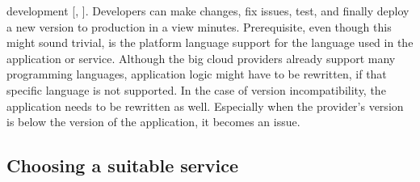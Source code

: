 \documentclass[11pt]{article}
\begin{document}
development [\cite{sewak2018winning}, \cite{leitner2019mixed}]. Developers can make changes, fix issues, test, and finally deploy a new version to production in a view minutes. Prerequisite, even though this might sound trivial, is the platform language support for the language used in the application or service. Although the big cloud providers already support many programming languages, application logic might have to be rewritten, if that specific language is not supported. In the case of version incompatibility, the application needs to be rewritten as well. Especially when the provider's version is below the version of the application, it becomes an issue.


\subsection{Choosing a suitable service}
\end{document}
